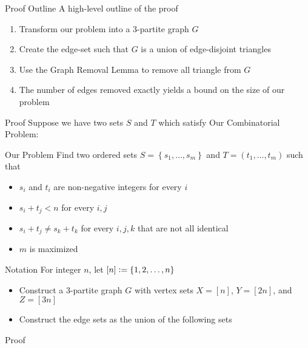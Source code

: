 \begin{frame}{Proof Outline}
A high-level outline of the proof
\begin{enumerate}
	\item Transform our problem into a $3$-partite graph $G$
	\item Create the edge-set such that $G$ is a union of edge-disjoint triangles
	\item Use the Graph Removal Lemma to remove all triangle from $G$
	\item The number of edges removed exactly yields a bound on the size of our problem
\end{enumerate}
\end{frame}

\begin{frame}{Proof}
Suppose we have two sets $S$ and $T$ which satisfy Our Combinatorial Problem:
{
	\begin{block}{Our Problem}
		Find two ordered sets $S = \left\lbrace s_1,\dotsc, s_m\right\rbrace$ and $T = \left(t_1,\dotsc, t_m\right)$ such that
		\begin{itemize}
			\item $s_i$ and $t_i$ are non-negative integers for every $i$
			\item $s_i + t_j < n$ for every $i,j$
			\item $s_i + t_j \neq s_k + t_k$ for every $i,j,k$ that are not all identical
			\item $m$ is maximized
		\end{itemize}
\end{block}}

\begin{block}{Notation}
	For integer $n$, let $[n]{\;\vcentcolon=\;} \{1,2,\dotsc, n\}$
\end{block}

\begin{itemize}
	\item Construct a 3-partite graph $G$ with vertex sets $X = [n]$, $Y = [2n]$, and $Z = [3n]$
	\item Construct the edge sets as the union of the following sets
\end{itemize}

\end{frame}

\begin{frame}{Proof}


	
\end{frame}

